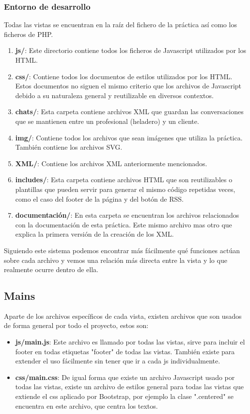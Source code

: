 \documentclass[11pt,a4paper]{article}
\begin{document}
\subsubsection{Entorno de desarrollo}
Todas las vistas se encuentran en la raíz del fichero de la práctica así como los ficheros de PHP.
\begin{enumerate}
\item \textbf{js/}: Este directorio contiene todos los ficheros de Javascript utilizados por los HTML.
\item \textbf{css/}: Contiene todos los documentos de estilos utilizados por los HTML. Estos documentos no siguen el mismo criterio que los archivos de Javascript debido a su naturaleza general y reutilizable en diversos contextos.
\item \textbf{chats/}: Esta carpeta contiene archivos XML que guardan las conversaciones que se mantienen entre un profesional (heladero) y un cliente.
\item \textbf{img/}: Contiene todos los archivos que sean imágenes que utiliza la práctica. También contiene los archivos SVG.
\item \textbf{XML/}: Contiene los archivos XML anteriormente mencionados.
\item \textbf{includes/}: Esta carpeta contiene archivos HTML que son reutilizables o plantillas que pueden servir para generar el mismo código repetidas veces, como el caso del footer de la página y del botón de RSS.
\item \textbf{documentación/}: En esta carpeta se encuentran los archivos relacionados con la documentación de esta práctica. Este mismo archivo mas otro que explica la primera versión de la creación de los XML.
\end{enumerate}

Siguiendo este sistema podemos encontrar más fácilmente qué funciones actúan sobre cada archivo y vemos una relación más directa entre la vista y lo que realmente ocurre dentro de ella.\\

\subsection{Mains}
Aparte de los archivos específicos de cada vista, existen archivos que son usados de forma general por todo el proyecto, estos son:
\begin{itemize}
\item \textbf{js/main.js}: Este archivo es llamado por todas las vistas, sirve para incluir el footer en todas etiquetas "footer" de todas las vistas. También existe para extender el uso fácilmente sin tener que ir a cada js individualmente.
\item \textbf{css/main.css}: De igual forma que existe un archivo Javascript usado por todas las vistas, existe un archivo de estilos general para todas las vistas que extiende el css aplicado por Bootstrap, por ejemplo la clase ".centered" se encuentra en este archivo, que centra los textos.
\end{itemize}
\end{document}
